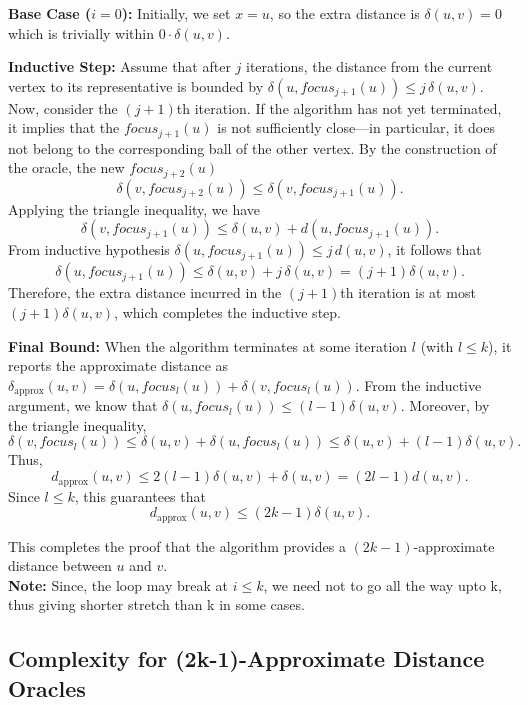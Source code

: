 \documentclass{article}
\begin{document}
\textbf{Base Case (\(i=0\)):}  
Initially, we set \(x=u\), so the extra distance is
\(\delta(u,v) = 0\)
which is trivially within \(0 \cdot \delta(u,v)\).

\textbf{Inductive Step:}  
Assume that after \(j\) iterations, the distance from the current vertex to its representative is bounded by
\(
\delta(u, focus_{j+1}(u)) \le j\,\delta(u,v).
\)\\
Now, consider the \((j+1)\)th iteration. If the algorithm has not yet terminated, it implies that the  \(focus_{j+1}(u)\) is not sufficiently close—in particular, it does not belong to the corresponding ball of the other vertex. By the construction of the oracle, the new \(focus_{j+2}(u)\)
\[
\delta(v, focus_{j+2}(u)) \le \delta(v, focus_{j+1}(u)).
\]
Applying the triangle inequality, we have
\[
\delta(v, focus_{j+1}(u)) \le \delta(u,v) + d(u, focus_{j+1}(u)).
\]
From  inductive hypothesis \(\delta(u, focus_{j+1}(u)) \le j\,d(u,v)\), it follows that
\[
\delta(u, focus_{j+1}(u)) \le \delta(u,v) + j\,\delta(u,v) = (j+1)\delta(u,v).
\]
Therefore, the extra distance incurred in the \((j+1)\)th iteration is at most \((j+1)\delta(u,v)\), which completes the inductive step.

\textbf{Final Bound:}  
When the algorithm terminates at some iteration \(l\) (with \(l\le k\)), it reports the approximate distance as
\(
\delta_{\text{approx}}(u,v)=\delta(u, focus_l(u)) + \delta(v, focus_l(u)).
\)
From the inductive argument, we know that \(\delta(u, focus_l(u)) \le (l-1)\delta(u,v)\). Moreover, by the triangle inequality,
\[
\delta(v, focus_l(u)) \le \delta(u,v) + \delta(u, focus_l(u)) \le \delta(u,v) + (l-1)\delta(u,v).
\]
Thus,
\[
d_{\text{approx}}(u,v) \le 2(l-1)\delta(u,v) + \delta(u,v) = (2l-1)d(u,v).
\]
Since \(l\le k\), this guarantees that
\[
d_{\text{approx}}(u,v) \le (2k-1)\delta(u,v).
\]

This completes the proof that the algorithm provides a \((2k-1)\)-approximate distance between \(u\) and \(v\).\\
\textbf{Note:} Since, the loop may break at \(i \leq k\), we need not to go all the way upto k, thus giving shorter stretch than k in some cases. 

\subsection{Complexity for (2k-1)-Approximate Distance Oracles}
\end{document}
